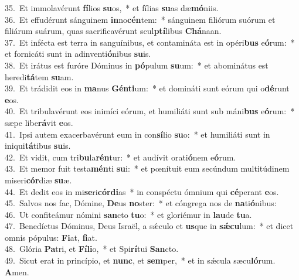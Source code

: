 {35.~}Et immolavérunt \textbf{fí}lios \textbf{su}os,~* et fílias \textbf{su}as dæ\textbf{mó}niis.\\
{36.~}Et effudérunt sánguinem \textbf{in}no\textbf{cén}tem:~* sánguinem filiórum suórum et filiárum suárum, quas sacrificavérunt scul\textbf{ptí}libus \textbf{Chá}naan.\\
{37.~}Et infécta est terra in sanguínibus, et contamináta est in opéri\textbf{bus} e\textbf{ó}rum:~* et fornicáti sunt in adinventi\textbf{ó}nibus \textbf{su}is.\\
{38.~}Et irátus est furóre Dóminus in \textbf{pó}pulum \textbf{su}um:~* et abominátus est heredi\textbf{tá}tem \textbf{su}am.\\
{39.~}Et trádidit eos in \textbf{ma}nus \textbf{Gén}\textbf{ti}um:~* et domináti sunt eórum qui o\textbf{dé}runt \textbf{e}os.\\
{40.~}Et tribulavérunt eos inimíci eórum, et humiliáti sunt sub máni\textbf{bus} e\textbf{ó}rum:~* sæpe libe\textbf{rá}vit \textbf{e}os.\\
{41.~}Ipsi autem exacerbavérunt eum in con\textbf{sí}lio \textbf{su}o:~* et humiliáti sunt in iniqui\textbf{tá}tibus \textbf{su}is.\\
{42.~}Et vidit, cum tri\textbf{bu}la\textbf{rén}tur:~* et audívit orati\textbf{ó}nem e\textbf{ó}rum.\\
{43.~}Et memor fuit testa\textbf{mén}ti \textbf{su}i:~* et pœnítuit eum secúndum multitúdinem miseri\textbf{cór}diæ \textbf{su}æ.\\
{44.~}Et dedit eos in mi\textbf{se}ri\textbf{cór}\textbf{di}as~* in conspéctu ómnium qui \textbf{cé}perant \textbf{e}os.\\
{45.~}Salvos nos fac, Dómine, \textbf{De}us \textbf{no}ster:~* et cóngrega nos de \textbf{na}ti\textbf{ó}nibus:\\
{46.~}Ut confiteámur nómini \textbf{san}cto \textbf{tu}o:~* et gloriémur in \textbf{lau}de \textbf{tu}a.\\
{47.~}Benedíctus Dóminus, Deus Israël, a sǽculo et \textbf{us}que in \textbf{sǽ}\textbf{cu}lum:~* et dicet omnis pópulus: \textbf{Fi}at, \textbf{fi}at.\\
{48.~}Glória \textbf{Pa}tri, et \textbf{Fí}\textbf{li}o,~* et Spi\textbf{rí}tui \textbf{San}cto.\\
{49.~}Sicut erat in princípio, et \textbf{nunc}, et \textbf{sem}per,~* et in sǽcula sæcu\textbf{ló}rum. \textbf{A}men.\\
